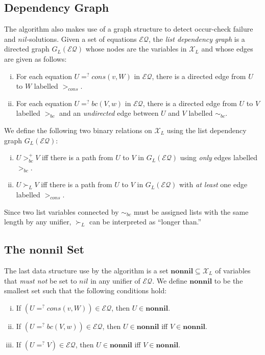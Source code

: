 \documentclass[11pt]{article}
\newcommand{\ueq}{=_{}^?}
\newcommand{\X}{\mathcal{X}}
\newcommand{\EQ}{\mathcal{EQ}}
\newcommand{\Bc}{\mathit{bc}}
\newcommand{\Cons}{\mathit{cons}}
\newcommand{\Nil}{\mathit{nil}}
\newcommand{\Nonnil}{\mathbf{nonnil}}
\begin{document}
\subsection{Dependency Graph}\label{subsection:graph}

The algorithm also makes use of a graph structure to detect occur-check failure
and $\Nil$-solutions. Given a set of equations $\EQ$, the \emph{list dependency
graph} is a directed graph $G_L(\EQ)$ whose nodes are the variables in $\X_L$ and
whose edges are given as follows:
\begin{enumerate}[(i)]
    \item For each equation $U \ueq \Cons(v, W)$ in $\EQ$, there is a directed
        edge from $U$ to $W$ labelled $>_{\Cons}$.
    \item For each equation $U \ueq \Bc(V, w)$ in $\EQ$, there is a directed
        edge from $U$ to $V$ labelled $>_{\Bc}$ and an \emph{undirected} edge
        between $U$ and $V$ labelled $\sim_{\Bc}$.
\end{enumerate}
We define the following two binary relations on $\X_L$ using the list dependency
graph $G_L(\EQ)$:
\begin{enumerate}[(i)]
    \item $U >_{\Bc}^+ V$ iff there is a path from $U$ to $V$ in $G_L(\EQ)$
        using \emph{only} edges labelled $>_{\Bc}$.

    \item $U \succ_L V$ iff there is a path from $U$ to $V$ in $G_L(\EQ)$ with
        \emph{at least} one edge labelled $>_{\Cons}$.
\end{enumerate}
Since two list variables connected by $\sim_{\Bc}$ must be assigned lists with
the same length by any unifier, $\succ_L$ can be interpreted as ``longer than.''

\subsection{The \texorpdfstring{$\Nonnil$}{nonnil} Set}
\label{subsection:nonnil}

The last data structure use by the algorithm is a set $\Nonnil \subseteq \X_L$
of variables that \emph{must not} be set to $\Nil$ in any unifier of $\EQ$. We
define $\Nonnil$ to be the smallest set such that the following conditions hold:
\begin{enumerate}[(i)]
    \item If $(U \ueq \Cons(v, W)) \in \EQ$, then $U \in \Nonnil$.
    \item If $(U \ueq \Bc(V, w)) \in \EQ$, then $U \in \Nonnil$ iff $V \in \Nonnil$.
    \item If $(U \ueq V) \in \EQ$, then $U \in \Nonnil$ iff $V \in \Nonnil$.
\end{enumerate}
\end{document}
